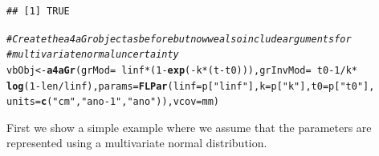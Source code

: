 \documentclass[a4paper,english,10pt]{article}\usepackage[]{graphicx}\usepackage[]{color}
\makeatletter
\newcommand{\hlnum}[1]{\textcolor[rgb]{0.686,0.059,0.569}{#1}}%
\newcommand{\hlstr}[1]{\textcolor[rgb]{0.192,0.494,0.8}{#1}}%
\newcommand{\hlcom}[1]{\textcolor[rgb]{0.678,0.584,0.686}{\textit{#1}}}%
\newcommand{\hlopt}[1]{\textcolor[rgb]{0,0,0}{#1}}%
\newcommand{\hlstd}[1]{\textcolor[rgb]{0.345,0.345,0.345}{#1}}%
\newcommand{\hlkwb}[1]{\textcolor[rgb]{0.69,0.353,0.396}{#1}}%
\newcommand{\hlkwc}[1]{\textcolor[rgb]{0.333,0.667,0.333}{#1}}%
\newcommand{\hlkwd}[1]{\textcolor[rgb]{0.737,0.353,0.396}{\textbf{#1}}}%
\newenvironment{kframe}{%
 \def\at@end@of@kframe{}%
 \ifinner\ifhmode%
  \def\at@end@of@kframe{\end{minipage}}%
  \begin{minipage}{\columnwidth}%
 \fi\fi%
 \def\FrameCommand##1{\hskip\@totalleftmargin \hskip-\fboxsep
 \colorbox{shadecolor}{##1}\hskip-\fboxsep
     \hskip-\linewidth \hskip-\@totalleftmargin \hskip\columnwidth}%
 \MakeFramed {\advance\hsize-\width
   \@totalleftmargin\z@ \linewidth\hsize
   \@setminipage}}%
 {\par\unskip\endMakeFramed%
 \at@end@of@kframe}
\newenvironment{knitrout}{}{} %
\newcommand{\code}[1]{{\texttt{#1}}}
\makeatother
\begin{document}
\begin{knitrout}
\begin{kframe}
\begin{alltt}
\end{alltt}
\begin{verbatim}
## [1] TRUE
\end{verbatim}
\begin{alltt}
\hlcom{# Create the a4aGr object as before but now we also include arguments for}
\hlcom{# multivariate normal uncertainty}
\hlstd{vbObj} \hlkwb{<-} \hlkwd{a4aGr}\hlstd{(}\hlkwc{grMod} \hlstd{=} \hlopt{~}\hlstd{linf} \hlopt{*} \hlstd{(}\hlnum{1} \hlopt{-} \hlkwd{exp}\hlstd{(}\hlopt{-}\hlstd{k} \hlopt{*} \hlstd{(t} \hlopt{-} \hlstd{t0))),} \hlkwc{grInvMod} \hlstd{=} \hlopt{~}\hlstd{t0} \hlopt{-} \hlnum{1}\hlopt{/}\hlstd{k} \hlopt{*}
    \hlkwd{log}\hlstd{(}\hlnum{1} \hlopt{-} \hlstd{len}\hlopt{/}\hlstd{linf),} \hlkwc{params} \hlstd{=} \hlkwd{FLPar}\hlstd{(}\hlkwc{linf} \hlstd{= p[}\hlstr{"linf"}\hlstd{],} \hlkwc{k} \hlstd{= p[}\hlstr{"k"}\hlstd{],} \hlkwc{t0} \hlstd{= p[}\hlstr{"t0"}\hlstd{],}
    \hlkwc{units} \hlstd{=} \hlkwd{c}\hlstd{(}\hlstr{"cm"}\hlstd{,} \hlstr{"ano-1"}\hlstd{,} \hlstr{"ano"}\hlstd{)),} \hlkwc{vcov} \hlstd{= mm)}
\end{alltt}
\end{kframe}
\end{knitrout}


First we show a simple example where we assume that the parameters are represented using a multivariate normal distribution.
\end{document}
